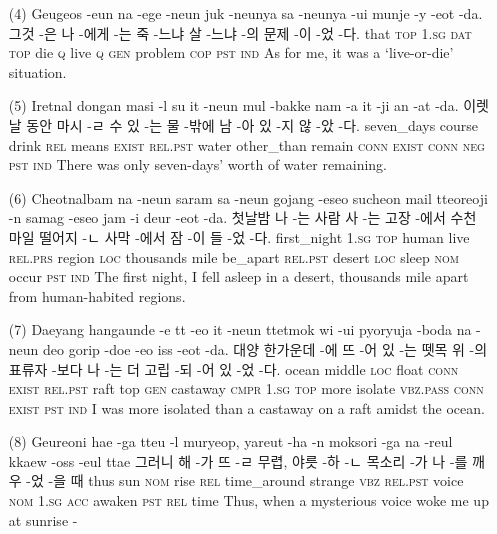 \begin{itemize}
\item [(4)]
\tgl
		{Geugeos -eun na -ege -neun juk -neunya sa -neunya -ui munje -y -eot -da.}
		{그것 -은 나 -에게 -는 죽 -느냐 살 -느냐 -의 문제 -이 -었 -다.}
		{that	\textsc{top}	\textsc{1.sg}	\textsc{dat}	\textsc{top}	die	\textsc{q}	live	\textsc{q}	\textsc{gen}	problem	\textsc{cop}	\textsc{pst}	\textsc{ind}}
		{As for me, it was a `live-or-die' situation.}
		
\item [(5)]
\tgl
		{Iretnal dongan masi -l su it -neun mul -bakke nam -a it -ji an -at -da.}
		{이렛날 동안 마시 -ㄹ 수 있 -는 물 -밖에 남 -아 있 -지 않 -았 -다.}
		{seven\_days	course	drink	\textsc{rel}	means	\textsc{exist}	\textsc{rel.pst}	water	other\_than	remain	\textsc{conn}	\textsc{exist}	\textsc{conn}	\textsc{neg}	\textsc{pst}	\textsc{ind}}
		{There was only seven-days' worth of water remaining.}
		
\item [(6)]
\tgl
		{Cheotnalbam na -neun saram sa -neun gojang -eseo sucheon mail tteoreoji -n samag -eseo jam -i deur -eot -da.}
		{첫날밤 나 -는 사람 사 -는 고장 -에서 수천 마일 떨어지 -ㄴ 사막 -에서 잠 -이 들 -었 -다.}
		{first\_night	\textsc{1.sg}	\textsc{top}	human	live	\textsc{rel.prs}	region	\textsc{loc}	thousands	mile	be\_apart	\textsc{rel.pst}	desert	\textsc{loc}	sleep	\textsc{nom}	occur	\textsc{pst}	\textsc{ind}}
		{The first night, I fell asleep in a desert, thousands mile apart from human-habited regions.}

\item [(7)]
\tgl
		{Daeyang hangaunde -e tt -eo it -neun ttetmok wi -ui pyoryuja -boda na -neun deo gorip -doe -eo iss -eot -da.}
		{대양 한가운데 -에 뜨 -어 있 -는 뗏목 위 -의 표류자 -보다 나 -는 더 고립 -되 -어 있 -었 -다.}
		{ocean	middle	\textsc{loc}	float	\textsc{conn}	\textsc{exist}	\textsc{rel.pst}	raft	top	\textsc{gen}	castaway	\textsc{cmpr}	\textsc{1.sg}	\textsc{top}	more	isolate	\textsc{vbz.pass}	\textsc{conn}	\textsc{exist}	\textsc{pst}	\textsc{ind}}
		{I was more isolated than a castaway on a raft amidst the ocean.}

\item [(8)]
\tgl
		{Geureoni hae -ga tteu -l muryeop, yareut -ha -n moksori -ga na -reul kkaew -oss -eul ttae}
		{그러니 해 -가 뜨 -ㄹ 무렵, 야릇 -하 -ㄴ 목소리 -가 나 -를 깨우 -었 -을 때}
		{thus	sun	\textsc{nom}	rise	\textsc{rel}	time\_around	strange	\textsc{vbz}	\textsc{rel.pst}	voice	\textsc{nom}	\textsc{1.sg}	\textsc{acc}	awaken	\textsc{pst}	\textsc{rel}	time}
		{Thus, when a mysterious voice woke me up at sunrise -}


\end{itemize}
